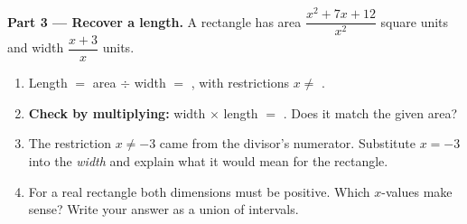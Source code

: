 \documentclass[10pt]{article}
\begin{document}
\begin{tcolorbox}[colback=white, colframe=black!40, title=\textbf{Tier E --- Extension},
    fonttitle=\bfseries, arc=1.5mm, left=3mm, right=3mm, top=2mm, bottom=2mm, breakable]
\vspace{5pt}
\textbf{Part 3 --- Recover a length.} A rectangle has area $\dfrac{x^2+7x+12}{x^2}$ square units and
width $\dfrac{x+3}{x}$ units.
\begin{enumerate}[label=(\alph*), leftmargin=1.9em, itemsep=6pt]
  \item Length $=$ area $\div$ width $=$ , \; with restrictions $x\neq$ .
  \item \textbf{Check by multiplying:} width $\times$ length $=$ . Does it match the
        given area? 
  \item The restriction $x\neq-3$ came from the divisor's numerator. Substitute $x=-3$ into the
        \emph{width} and explain what it would mean for the rectangle.
  \item For a real rectangle both dimensions must be positive. Which $x$-values make sense? Write
        your answer as a union of intervals. 
\end{enumerate}
\end{tcolorbox}
\end{document}
